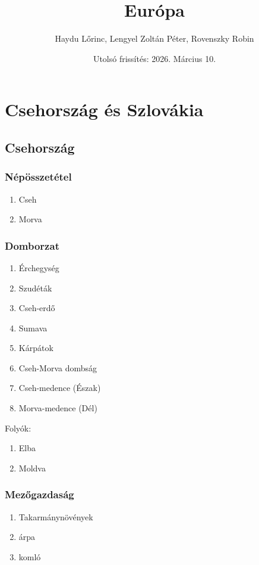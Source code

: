 \documentclass{article}
\title{Európa}
\author{Haydu Lőrinc, Lengyel Zoltán Péter, Rovenszky Robin}
\date{Utolsó frissítés: 2026. Március 10.}
\begin{document}
\maketitle
\tableofcontents

\newpage

\section{Csehország és Szlovákia}

\subsection{Csehország}
\subsubsection{Népösszetétel}
\begin{enumerate}
    \item Cseh
    \item Morva
\end{enumerate}

\subsubsection{Domborzat}
\begin{enumerate}
    \item Érchegység
    \item Szudéták
    \item Cseh-erdő
    \item Sumava
    \item Kárpátok
    \item Cseh-Morva dombság
    \item Cseh-medence (Észak)
    \item Morva-medence (Dél)
\end{enumerate}

Folyók:
\begin{enumerate}
    \item Elba
    \item Moldva
\end{enumerate}

\subsubsection{Mezőgazdaság}
\begin{enumerate}
    \item Takarmánynövények
    \item árpa
    \item komló
\end{enumerate}
\end{document}
